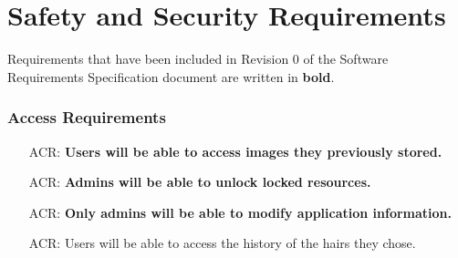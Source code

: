 \documentclass{article}
\newcounter{acrreqnum} %
\begin{document}
\section{Safety and Security Requirements}

Requirements that have been included in Revision 0 of the Software Requirements Specification document are written in \textbf{bold}. 

\subsubsection{Access Requirements}
\begin{itemize}
    \item[ACR\refstepcounter{acrreqnum}\theacrreqnum \label{R_Inputs}:] \textbf{Users will be able to access images they previously stored.}
    \item[ACR\refstepcounter{acrreqnum}\theacrreqnum \label{R_Inputs}:]
    \textbf{Admins will be able to unlock locked resources.}
    \item[ACR\refstepcounter{acrreqnum}\theacrreqnum \label{R_Inputs}:]
    \textbf{Only admins will be able to modify application information.}
    \item[ACR\refstepcounter{acrreqnum}\theacrreqnum\label{R_Inputs}:] 
    Users will be able to access the history of the hairs they chose.
\end{itemize}
\end{document}
